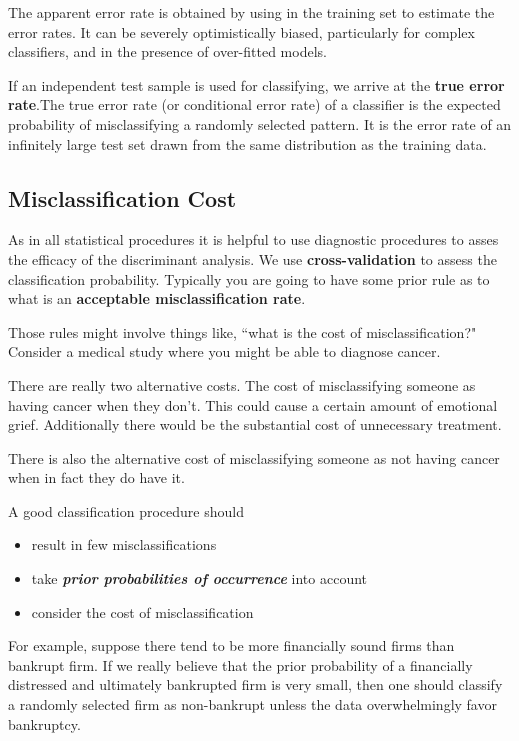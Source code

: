 \documentclass[12pt]{article}
\begin{document}
The apparent error rate is obtained by using in the training set to estimate
the error rates. It can be severely optimistically biased, particularly for complex classifiers, and in the presence of over-fitted models.


If an independent test sample is used for classifying, we arrive at the  \textbf{true error rate}.The true error rate (or conditional error rate) of a classifier is the expected
probability of misclassifying a randomly selected pattern.
It is the error rate of an infinitely large test set drawn from the same distribution as the training data.




\subsection{Misclassification Cost}

As in all statistical procedures it is helpful to use diagnostic procedures to asses the efficacy of the discriminant analysis. We use \textbf{cross-validation} to assess the classification probability.
Typically you are going to have some prior rule as to what is an \textbf{acceptable misclassification rate}.

Those rules might involve things like, ``what is the cost of misclassification?" Consider a medical study where you might be able to diagnose cancer.

There are really two alternative costs. The cost of misclassifying someone as having cancer when they don't.
This could cause a certain amount of emotional grief. Additionally there would be the substantial cost of unnecessary treatment.

There is also the alternative cost of misclassifying someone as not having cancer when in fact they do have it.

A good classification procedure should
 \begin{itemize}
 \item result in few misclassifications
 \item take \textbf{\textit{prior probabilities of occurrence}} into account
 \item consider the cost of misclassification
 \end{itemize}
 
For example, suppose there tend to be more financially sound firms than bankrupt
firm. If we really believe that the prior probability of a financially
distressed and ultimately bankrupted firm is very small, then one should
classify a randomly selected firm as non-bankrupt unless the data
overwhelmingly favor bankruptcy.
\end{document}
